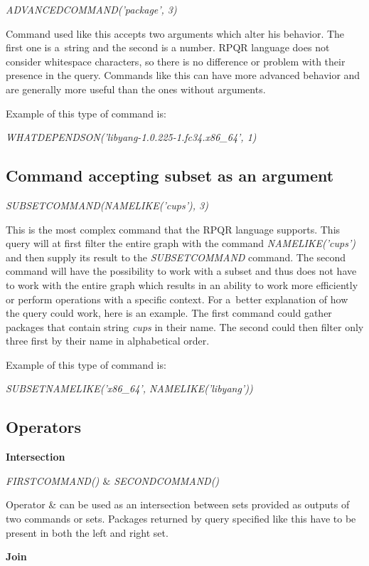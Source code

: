 \textit{ADVANCEDCOMMAND('package', 3)}

Command used like this accepts two arguments which alter his behavior. The first one is a~string
and the second is a number. RPQR language does not consider whitespace characters, so there is no
difference or problem with their presence in the query. Commands like this can have more advanced
behavior and are generally more useful than the ones without arguments.

Example of this type of command is:

\textit{WHATDEPENDSON('libyang-1.0.225-1.fc34.x86\_64', 1)}

\subsection*{Command accepting subset as an argument}

\textit{SUBSETCOMMAND(NAMELIKE('cups'), 3)}

This is the most complex command that the RPQR language supports. This query will at first filter the
entire graph with the command \textit{NAMELIKE('cups')} and then supply its result to the \textit{SUBSETCOMMAND}
command. The second command will have the possibility to work with a subset and thus does not have to
work with the entire graph which results in an ability to work more efficiently or perform operations
with a specific context. For a~better explanation of how the query could work, here is an example.
The first command could gather packages that contain string \textit{cups} in their name. The second
could then filter only three first by their name in alphabetical order.

Example of this type of command is:

\textit{SUBSETNAMELIKE('x86\_64', NAMELIKE('libyang'))}

\newpage

\subsection*{Operators}

\textbf{Intersection}

\textit{FIRSTCOMMAND() $\&$ SECONDCOMMAND()}

Operator \& can be used as an intersection between sets provided as outputs of two commands or sets.
Packages returned by query specified like this have to be present in both the left and right set.

\textbf{Join}


